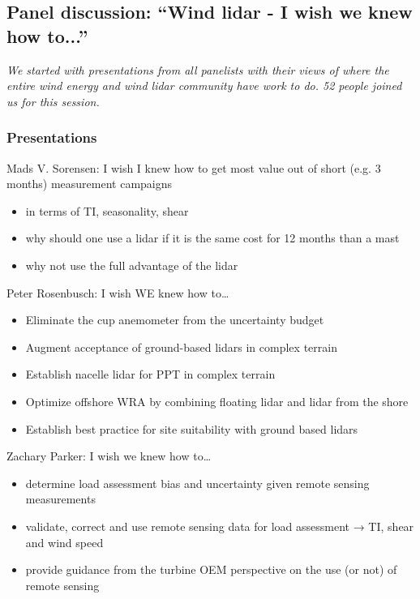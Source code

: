 \subsection{Panel discussion: \enquote{Wind lidar - I wish we knew how to...}}

\emph{We started with presentations from all panelists with their views
of where the entire wind energy and wind lidar community have work to
do. 52 people joined us for this session.}

\subsubsection{Presentations}

Mads V. Sorensen: I wish I knew how to get most value out of short (e.g. 3 months) measurement campaigns

\begin{itemize}
    \item in terms of TI, seasonality, shear
    \item why should one use a lidar if it is the same cost for 12 months than a mast
    \item why not use the full advantage of the lidar
\end{itemize}

Peter Rosenbusch: I wish WE knew how to\ldots{}

\begin{itemize}
    \item Eliminate the cup anemometer from the uncertainty budget
    \item Augment acceptance of ground-based lidars in complex terrain
    \item Establish nacelle lidar for PPT in complex terrain
    \item Optimize offshore WRA by combining floating lidar and lidar from the shore
    \item Establish best practice for site suitability with ground based lidars
\end{itemize}

Zachary Parker: I wish we knew how to\ldots{}

\begin{itemize}
    \item determine load assessment bias and uncertainty given remote sensing measurements
    \item validate, correct and use remote sensing data for load assessment → TI, shear and wind speed
    \item provide guidance from the turbine OEM perspective on the use (or not) of remote sensing
\end{itemize}

